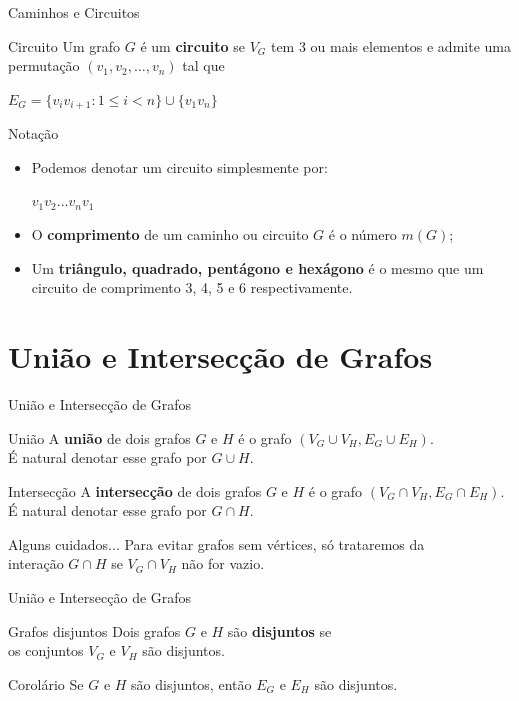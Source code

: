 \documentclass[xcolor=dvipsnames,table]{beamer}
\begin{document}
	\begin{frame}[shrink]{Caminhos e Circuitos}
		\begin{block}{Circuito}
			Um grafo $G$ é um {\bf circuito} se $V_G$ tem 3 ou mais elementos e admite uma permutação $(v_1, v_2, \ldots , v_n)$ tal que
			\begin{center}
				$E_G = \{ v_i v_{i +1} : 1 \leq i < n \} \cup \{ v_1 v_n \}$
			\end{center} 
		\end{block} 
		\begin{block}{Notação}
			\begin{itemize}
				\item Podemos denotar um circuito simplesmente por:  
				\begin{center}
					$v_1 v_2 \ldots v_n v_1$		
				\end{center}
				\item O {\bf comprimento} de um caminho ou circuito $G$ é o número $m(G)$; 
				\item Um {\bf triângulo, quadrado, pentágono {e} hexágono} é o mesmo que um circuito de comprimento 3, 4, 5 e 6 respectivamente.
			\end{itemize}
		\end{block}
	\end{frame}
	\section{União e Intersecção de Grafos}
	\begin{frame}{União e Intersecção de Grafos}
		\begin{block}{União}
			A {\bf união} de dois grafos $G$ e $H$ é o grafo $(V_G \cup V_H, E_G \cup E_H)$. \\É natural denotar esse grafo por $G \cup H$.
		\end{block} \pause
		\begin{block}{Intersecção}
			A {\bf intersecção} de dois grafos $G$ e $H$ é o grafo $(V_G \cap V_H, E_G \cap E_H)$. É natural denotar esse grafo por $G \cap H$.
		\end{block} \pause
		\begin{alertblock}{Alguns cuidados...}
			Para evitar grafos sem vértices, só trataremos da \\interação $G \cap H$ se $V_G \cap V_H$ não for vazio.
		\end{alertblock}
	\end{frame}
	
	\begin{frame}{União e Intersecção de Grafos}
		\begin{block}{Grafos disjuntos}
			Dois grafos $G$ e $H$ são {\bf disjuntos} se \\os conjuntos $V_G$ e $V_H$ são disjuntos.
		\end{block} \pause
		\begin{block}{Corolário}
			Se $G$ e $H$ são disjuntos, então $E_G$ e $E_H$ são disjuntos.
		\end{block}
	\end{frame}
\end{document}
